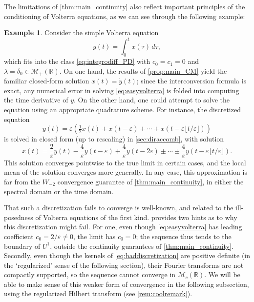\documentclass{cams-l} %
\newcommand{\RR}{\mathbb R}
\newcommand{\cM}{\mathcal M}
\newcommand{\eps}{\varepsilon}
\theoremstyle{definition}
\newtheorem{example}[theorem]{Example}
\theoremstyle{remark}
\numberwithin{equation}{section}
\begin{document}
The limitations of \cref{thm:main_continuity} also reflect important principles of the conditioning of Volterra equations, as we can see through the following example:
\begin{example}\label{ex:easyvolterra}
    Consider the simple Volterra equation
    \begin{equation}\label{eq:easyvolterra}
        y(t) = \int_0^t x(\tau)\,d\tau,
    \end{equation}
    which fits into the class \ref{eq:integrodiff_PD} with $c_0=c_1=0$ and $\lambda = \delta_0\in\cM_+(\RR)$. On one hand, the results of \cref{prop:main_CM} yield the familiar closed-form solution $x(t) = \dot{y}(t)$; since the interconversion formula is exact, any numerical error in solving \eqref{eq:easyvolterra} is folded into computing the time derivative of $y$. On the other hand, one could attempt to solve the equation using an appropriate quadrature scheme. For instance, the discretized equation
    \begin{equation}\label{eq:baddiscretization}
        y(t) = \eps\left(\tfrac{1}{2}x(t) + x(t-\eps) + \cdots + x(t-\eps\lfloor t/\eps\rfloor)\right)
    \end{equation}
    is solved in closed form (up to rescaling) in \cref{sec:diraccomb}, with solution
    \[x(t) = \frac{2}{\eps}y(t) - \frac{4}{\eps}y(t-\eps) + \frac{4}{\eps}y(t-2\eps)\pm\cdots\pm \frac{4}{\eps}y(t-\eps\lfloor t/\eps\rfloor).\]
    This solution converges pointwise to the true limit in certain cases, and the local mean of the solution converges more generally. In any case, this approximation is far from the $W_{-2}$ convergence guarantee of \cref{thm:main_continuity}, in either the spectral domain or the time domain.

    That such a discretization fails to converge is well-known, and related to the ill-posedness of Volterra equations of the first kind.  provides two hints as to why this discretization might fail. For one, even though \cref{eq:easyvolterra} has leading coefficient $c_0 = 2/\eps\neq 0$, the limit has $c_0=0$; the sequence thus tends to the boundary of $U^1$, outside the continuity guarantees of \cref{thm:main_continuity}. Secondly, even though the kernels of \cref{eq:baddiscretization} are positive definite (in the `regularized' sense of the following section), their Fourier transforms are not compactly supported, so the sequence cannot converge in $\cM_c(\RR)$. We will be able to make sense of this weaker form of convergence in the following subsection, using the regularized Hilbert transform (see \cref{rem:coolremark}).
\end{example}
\end{document}
